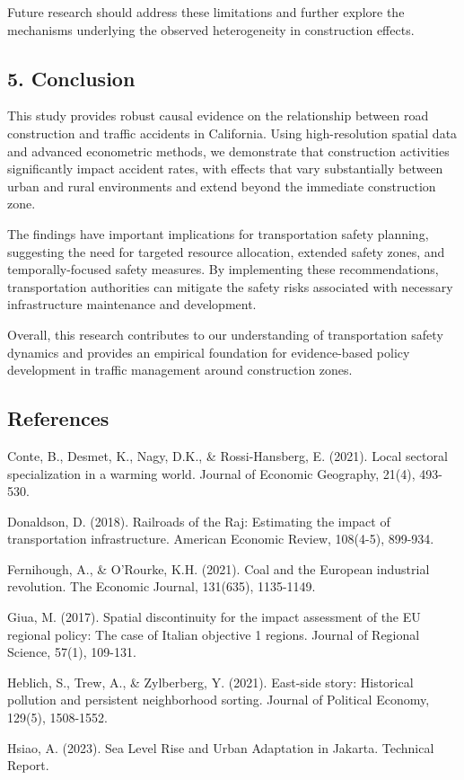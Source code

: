 \documentclass[
]{article}
\begin{document}
Future research should address these limitations and further explore the
mechanisms underlying the observed heterogeneity in construction
effects.

\subsection{5. Conclusion}\label{conclusion}

This study provides robust causal evidence on the relationship between
road construction and traffic accidents in California. Using
high-resolution spatial data and advanced econometric methods, we
demonstrate that construction activities significantly impact accident
rates, with effects that vary substantially between urban and rural
environments and extend beyond the immediate construction zone.

The findings have important implications for transportation safety
planning, suggesting the need for targeted resource allocation, extended
safety zones, and temporally-focused safety measures. By implementing
these recommendations, transportation authorities can mitigate the
safety risks associated with necessary infrastructure maintenance and
development.

Overall, this research contributes to our understanding of
transportation safety dynamics and provides an empirical foundation for
evidence-based policy development in traffic management around
construction zones.

\subsection{References}\label{references}

Conte, B., Desmet, K., Nagy, D.K., \& Rossi-Hansberg, E. (2021). Local
sectoral specialization in a warming world. Journal of Economic
Geography, 21(4), 493-530.

Donaldson, D. (2018). Railroads of the Raj: Estimating the impact of
transportation infrastructure. American Economic Review, 108(4-5),
899-934.

Fernihough, A., \& O'Rourke, K.H. (2021). Coal and the European
industrial revolution. The Economic Journal, 131(635), 1135-1149.

Giua, M. (2017). Spatial discontinuity for the impact assessment of the
EU regional policy: The case of Italian objective 1 regions. Journal of
Regional Science, 57(1), 109-131.

Heblich, S., Trew, A., \& Zylberberg, Y. (2021). East-side story:
Historical pollution and persistent neighborhood sorting. Journal of
Political Economy, 129(5), 1508-1552.

Hsiao, A. (2023). Sea Level Rise and Urban Adaptation in Jakarta.
Technical Report.
\end{document}
